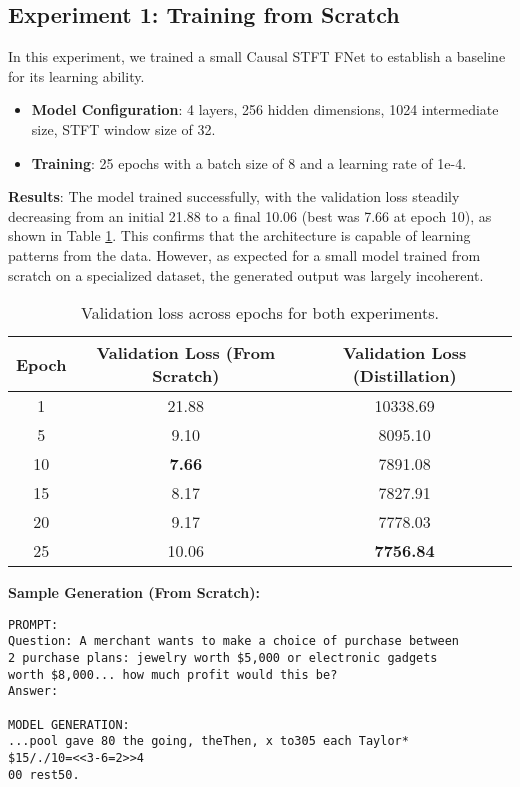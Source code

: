 \documentclass[11pt,a4paper]{article}
\begin{document}
\subsection{Experiment 1: Training from Scratch}
In this experiment, we trained a small Causal STFT FNet to establish a baseline for its learning ability.
\begin{itemize}
    \item \textbf{Model Configuration}: 4 layers, 256 hidden dimensions, 1024 intermediate size, STFT window size of 32.
    \item \textbf{Training}: 25 epochs with a batch size of 8 and a learning rate of 1e-4.
\end{itemize}

\textbf{Results}: The model trained successfully, with the validation loss steadily decreasing from an initial 21.88 to a final 10.06 (best was 7.66 at epoch 10), as shown in Table \ref{tab:loss_results}. This confirms that the architecture is capable of learning patterns from the data. However, as expected for a small model trained from scratch on a specialized dataset, the generated output was largely incoherent.

\begin{table}[h]
\centering
\caption{Validation loss across epochs for both experiments.}
\label{tab:loss_results}
\begin{tabular}{ccc}
\toprule
\textbf{Epoch} & \textbf{Validation Loss (From Scratch)} & \textbf{Validation Loss (Distillation)} \\
\midrule
1  & 21.88 & 10338.69 \\
5  & 9.10  & 8095.10  \\
10 & \textbf{7.66}  & 7891.08  \\
15 & 8.17  & 7827.91  \\
20 & 9.17  & 7778.03  \\
25 & 10.06 & \textbf{7756.84}  \\
\bottomrule
\end{tabular}
\end{table}

\textbf{Sample Generation (From Scratch):}
\begin{verbatim}
PROMPT:
Question: A merchant wants to make a choice of purchase between 
2 purchase plans: jewelry worth $5,000 or electronic gadgets 
worth $8,000... how much profit would this be?
Answer:

MODEL GENERATION:
...pool gave 80 the going, theThen, x to305 each Taylor* 
$15/./10=<<3-6=2>>4
00 rest50.
\end{verbatim}
\end{document}
